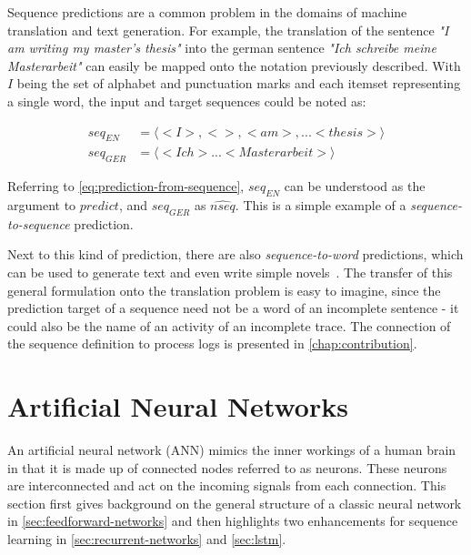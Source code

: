 Sequence predictions are a common problem in the domains of machine translation and text generation. For example, the translation of the sentence \textit{"I am writing my master's thesis"} into the german sentence \textit{"Ich schreibe meine Masterarbeit"} can easily be mapped onto the notation previously described. With $I$ being the set of alphabet and punctuation marks and each itemset representing a single word, the input and target sequences could be noted as:

\begin{equation*}
\begin{split}
seq_{EN} &= \langle<I>, < >, <am>, ... <thesis>\rangle\\
seq_{GER} &= \langle<Ich> ... <Masterarbeit>\rangle
\end{split}
\end{equation*}

Referring to \autoref{eq:prediction-from-sequence}, $seq_{EN}$ can be understood as the argument to $predict$, and $seq_{GER}$ as $\widehat{nseq}$. This is a simple example of a \textit{sequence-to-sequence} prediction.

Next to this kind of prediction, there are also \textit{sequence-to-word} predictions, which can be used to generate text and even write simple novels~\cite{web:text-generation-machinelearningmastery, web:text-generation-freecodecamp}. The transfer of this general formulation onto the translation problem is easy to imagine, since the prediction target of a sequence need not be a word of an incomplete sentence - it could also be the name of an activity of an incomplete trace. The connection of the sequence definition to process logs is presented in \autoref{chap:contribution}.

\section{Artificial Neural Networks}\label{sec:artificial-neural-networks}
An artificial neural network (ANN) mimics the inner workings of a human brain in that it is made up of connected nodes referred to as neurons. These neurons are interconnected and act on the incoming signals from each connection. This section first gives background on the general structure of a classic neural network in \autoref{sec:feedforward-networks} and then highlights two enhancements for sequence learning in \autoref{sec:recurrent-networks} and \autoref{sec:lstm}.

